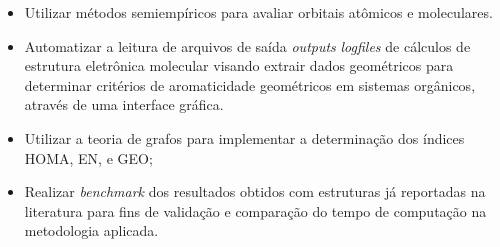 \begin{itemize}
    
    \item Utilizar métodos semiempíricos para avaliar orbitais atômicos e moleculares.
    
    \item Automatizar a leitura de arquivos de saída \textit{outputs} \textit{logfiles} de cálculos de estrutura eletrônica molecular visando extrair dados geométricos para determinar critérios de aromaticidade geométricos em sistemas orgânicos, através de uma interface gráfica.

    \item Utilizar a teoria de grafos para implementar a determinação dos índices HOMA, EN, e GEO; 
    
    \item Realizar \textit{benchmark} dos resultados obtidos com estruturas já reportadas na literatura para fins de  validação e comparação do tempo de computação na metodologia aplicada.
\end{itemize}